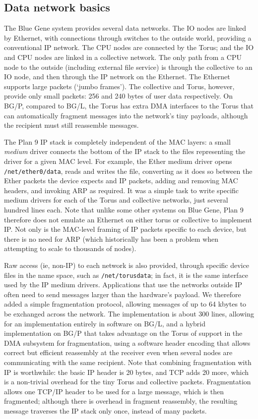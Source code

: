 \subsection{Data network basics}
The Blue Gene system provides several data networks.
The IO nodes are linked by Ethernet, with connections through switches to the outside world, providing a conventional IP network.
The CPU nodes are connected by the Torus; and the IO and CPU nodes are linked in a collective network.
The only path from a CPU node to the outside (including external file service) is through the collective to an IO node, and then through the IP network on the Ethernet.
The Ethernet supports large packets (`jumbo frames').
The collective and Torus, however, provide only small packets: 256 and 240 bytes of user data respectively.
On BG/P, compared to BG/L, the Torus has extra DMA interfaces to the Torus that
can automatically fragment messages into the network's tiny payloads,
although the recipient must still reassemble messages.

The Plan 9 IP stack is completely independent of the MAC layers: a small 
\emph{medium} driver connects the bottom of the IP stack to the files representing the driver for a given MAC level.
For example, the Ether medium driver opens \texttt{/net/ether0/data}, reads and writes the file, converting as it does so between the Ether packets the device expects and IP packets, adding and removing MAC headers, and invoking ARP as required.
It was a simple task to write specific medium drivers for each of the Torus and collective networks, just several hundred lines each.
Note that unlike some other systems on Blue Gene, Plan 9 therefore does not emulate an Ethernet on either torus or collective to implement IP. Not only is the MAC-level framing of IP packets specific to each device, but there is no need for ARP (which historically has been a problem when attempting to scale to thousands of nodes).

Raw access (ie, non-IP) to each network is also provided, through specific device files in the name space, such as \texttt{/net/torusdata}; in fact, it is the same interface used by the IP medium drivers.
Applications that use the networks outside IP often need to send messages larger than the hardware's payload.
We therefore added a simple fragmentation protocol, allowing messages of up to 64 kbytes to be exchanged across the network.
The implementation is about 300 lines, allowing for an implementation entirely in software on BG/L, and a hybrid implementation on BG/P that takes advantage on the Torus of support in the DMA subsystem for fragmentation, using a software header encoding that allows correct but efficient reassembly at the receiver even when several nodes are communicating with the same recipient.
Note that combining fragmentation with IP is worthwhile: the basic IP header is 20 bytes, and TCP adds 20 more, which is a non-trivial overhead for the tiny Torus and collective packets.
Fragmentation allows one TCP/IP header to be used for a large message, which is then fragmented; although there is overhead in fragment reassembly, the resulting message traverses the IP stack only once, instead of many packets.

